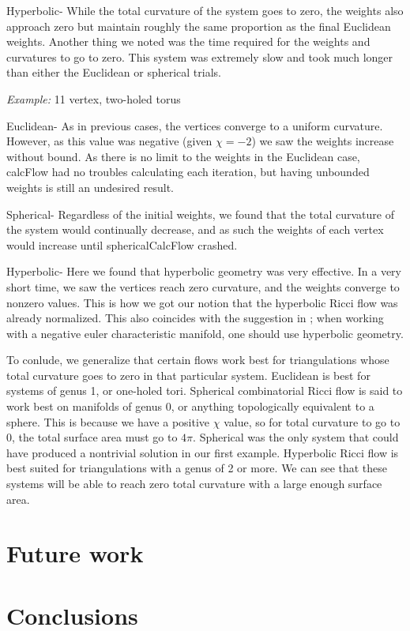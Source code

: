 \documentclass[12pt]{article}
\begin{document}
\noindent Hyperbolic- While the total curvature of the system goes to zero, the weights also approach zero but maintain roughly the same proportion as the final Euclidean weights. Another thing we noted was the time required for the weights and curvatures to go to zero. This system was extremely slow and took much longer than either the Euclidean or spherical trials. \newline

\noindent \textit{Example:} 11 vertex, two-holed torus\newline

\noindent Euclidean- As in previous cases, the vertices converge to a uniform curvature. However, as this value was negative (given $\chi = -2$) we saw the weights increase without bound. As there is no limit to the weights in the Euclidean case, calcFlow had no troubles calculating each iteration, but having unbounded weights is still an undesired result. \newline

\noindent Spherical- Regardless of the initial weights, we found that the total curvature of the system would continually decrease, and as such the weights of each vertex would increase until sphericalCalcFlow crashed. \newline

\noindent Hyperbolic- Here we found that hyperbolic geometry was very effective. In a very short time, we saw the vertices reach zero curvature, and the weights converge to nonzero values. This is how we got our notion that the hyperbolic Ricci flow was already normalized. This also coincides with the suggestion in \cite{chowluo}; when working with a negative euler characteristic manifold, one should use hyperbolic geometry.\newline

\noindent To conlude, we generalize that certain flows work best for triangulations whose total curvature goes to zero in that particular system. Euclidean is best for systems of genus 1, or one-holed tori. Spherical combinatorial Ricci flow is said to work best on manifolds of genus 0, or anything topologically equivalent to a sphere. This is because we have a positive $\chi$ value, so for total curvature to go to 0, the total surface area must go to $4\pi$. Spherical was the only system that could have produced a nontrivial solution in our first example. Hyperbolic Ricci flow is best suited for triangulations with a genus of 2 or more. We can see that these systems will be able to reach zero total curvature with a large enough surface area. 
\section{Future work}
\label{Future}

\section{Conclusions}

\newpage
  

\end{document}
